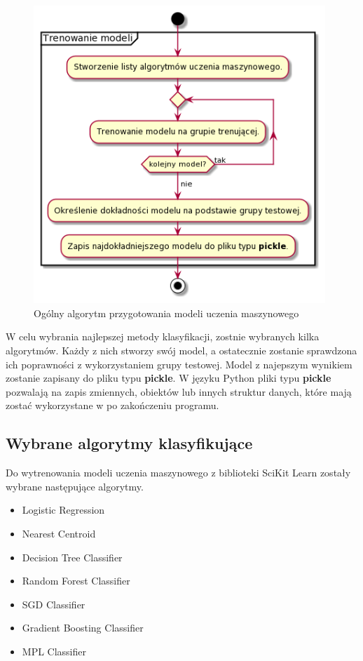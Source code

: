     \begin{figure}[H]
        \begin{center}
            \includegraphics[width=11cm]{../images/train_models.png}
            \caption{Ogólny algorytm przygotowania modeli uczenia maszynowego}
        \end{center}
    \end{figure}
    
    \quad W celu wybrania najlepszej metody klasyfikacji, zostnie wybranych kilka algorytmów. Każdy z nich stworzy swój model, a ostatecznie zostanie sprawdzona ich poprawności z wykorzystaniem grupy testowej. Model z najepszym wynikiem zostanie zapisany do pliku typu \textbf{pickle}. W języku Python pliki typu \textbf{pickle} pozwalają na zapis zmiennych, obiektów lub innych struktur danych, które mają zostać wykorzystane w po zakończeniu programu. 

    \subsection{Wybrane algorytmy klasyfikujące}

    \quad Do wytrenowania modeli uczenia maszynowego z biblioteki SciKit Learn zostały wybrane następujące algorytmy. 

    \begin{itemize}
        \item Logistic Regression
        \item Nearest Centroid 
        \item Decision Tree Classifier 
        \item Random Forest Classifier 
        \item SGD Classifier
        \item Gradient Boosting Classifier
        \item MPL Classifier
    \end{itemize}

